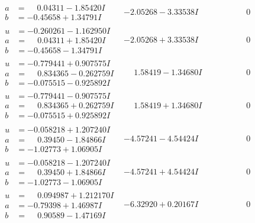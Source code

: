 \documentclass[1p]{elsarticle_modified}
\theoremstyle{definition}
\begin{document}
$$\begin{array}{c|c|c}
\begin{aligned}
a &= \phantom{-}0.04311 - 1.85420 I \\
b &= -0.45658 + 1.34791 I\end{aligned}
 & -2.05268 - 3.33538 I & \phantom{-0.000000 } 0 \\ \hline\begin{aligned}
u &= -0.260261 - 1.162950 I \\
a &= \phantom{-}0.04311 + 1.85420 I \\
b &= -0.45658 - 1.34791 I\end{aligned}
 & -2.05268 + 3.33538 I & \phantom{-0.000000 } 0 \\ \hline\begin{aligned}
u &= -0.779441 + 0.907575 I \\
a &= \phantom{-}0.834365 - 0.262759 I \\
b &= -0.075515 - 0.925892 I\end{aligned}
 & \phantom{-}1.58419 - 1.34680 I & \phantom{-0.000000 } 0 \\ \hline\begin{aligned}
u &= -0.779441 - 0.907575 I \\
a &= \phantom{-}0.834365 + 0.262759 I \\
b &= -0.075515 + 0.925892 I\end{aligned}
 & \phantom{-}1.58419 + 1.34680 I & \phantom{-0.000000 } 0 \\ \hline\begin{aligned}
u &= -0.058218 + 1.207240 I \\
a &= \phantom{-}0.39450 - 1.84866 I \\
b &= -1.02773 + 1.06905 I\end{aligned}
 & -4.57241 - 4.54424 I & \phantom{-0.000000 } 0 \\ \hline\begin{aligned}
u &= -0.058218 - 1.207240 I \\
a &= \phantom{-}0.39450 + 1.84866 I \\
b &= -1.02773 - 1.06905 I\end{aligned}
 & -4.57241 + 4.54424 I & \phantom{-0.000000 } 0 \\ \hline\begin{aligned}
u &= \phantom{-}0.094987 + 1.212170 I \\
a &= -0.79398 + 1.46987 I \\
b &= \phantom{-}0.90589 - 1.47169 I\end{aligned}
 & -6.32920 + 0.20167 I & \phantom{-0.000000 } 0 \\ \hline\begin{aligned}

\end{aligned}
\end{array}$$
\end{document}
